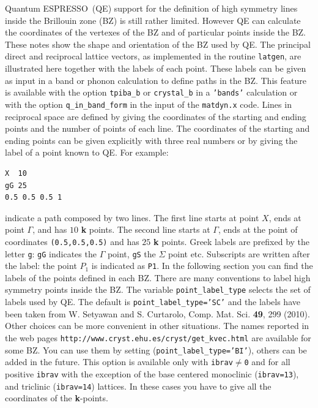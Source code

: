 \documentclass[12pt,a4paper]{article}
\def\qe{{\sc Quantum ESPRESSO}}
\begin{document}
\qe\ (QE) support for the definition of high symmetry lines inside the Brillouin
zone (BZ) is still rather limited. However QE can calculate the coordinates 
of the vertexes of the BZ and of particular points inside the BZ. These 
notes show the shape and orientation of the BZ used by QE. The principal 
direct and reciprocal lattice vectors, as implemented 
in the routine \texttt{latgen}, are illustrated here together with the labels 
of each point. These labels can be given as input in a band or phonon 
calculation to define paths in the BZ. This feature is available with 
the option \texttt{tpiba\_b} or \texttt{crystal\_b} in a \texttt{'bands'} 
calculation or with the option \texttt{q\_in\_band\_form} in the input of the 
\texttt{matdyn.x} code.
Lines in reciprocal space are defined by giving the coordinates of the 
starting and ending points and the number of points of each line.
The coordinates of the starting and ending points can be 
given explicitly with three real numbers or by giving the label of a 
point known to QE.
For example:
\begin{verbatim}
X  10
gG 25
0.5 0.5 0.5 1
\end{verbatim}
indicate a path composed by two lines. The first line starts at point $X$,
ends at point $\Gamma$, and has $10$ {\bf k} points. The second line starts
at $\Gamma$, ends at the point of coordinates \texttt{(0.5,0.5,0.5)} and
has $25$ {\bf k} points. Greek labels are prefixed by the letter
\texttt{g}: \texttt{gG} indicates the $\Gamma$ point, \texttt{gS} the 
$\Sigma$ point etc. Subscripts are written after the label: the point $P_1$ 
is indicated as \texttt{P1}. In the following section you can find the
labels of the points defined in each BZ. 
There are many conventions to label high symmetry
points inside the BZ. The variable \texttt{point\_label\_type} selects the
set of labels used by QE. The default is \texttt{point\_label\_type='SC'} and
the labels have been taken from W. Setyawan and S. Curtarolo, Comp. Mat. Sci.
{\bf 49}, 299 (2010). Other choices can be more convenient in other situations. 
The names reported in the web pages 
\texttt{http://www.cryst.ehu.es/cryst/get\_kvec.html}
are available for some BZ. You can use them by setting
(\texttt{point\_label\_type='BI'}), others can be added in the future.
This option is available only with \texttt{ibrav$\ne$0} and for 
all positive \texttt{ibrav} with the exception of the base centered 
monoclinic (\texttt{ibrav=13}), and triclinic (\texttt{ibrav=14}) lattices. 
In these cases you have to give all the coordinates of the {\bf k}-points.
\end{document}

